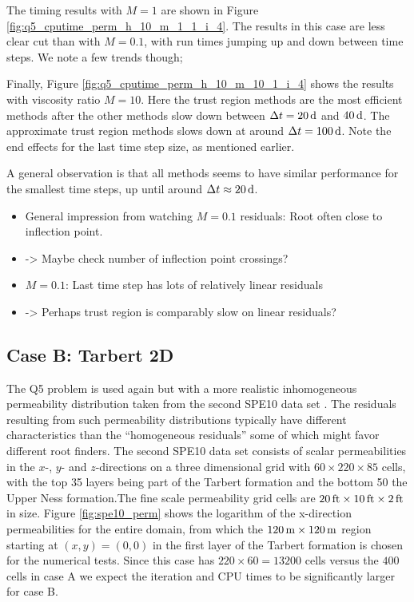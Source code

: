 The timing results with $M = 1$ are shown in Figure \ref{fig:q5_cputime_perm_h_10_m_1_1_i_4}. The results in this case are less clear cut than with $M = 0.1$, with run times jumping up and down between time steps. We note a few trends though; 

Finally, Figure \ref{fig:q5_cputime_perm_h_10_m_10_1_i_4} shows the results with viscosity ratio $M = 10$. Here the trust region methods are the most efficient methods after the other methods slow down between $\Delta t = \unit[20]{d}$ and $\unit[40]{d}$. The approximate trust region methods slows down at around $\Delta t = \unit[100]{d}$. Note the end effects for the last time step size, as mentioned earlier.

A general observation is that all methods seems to have similar performance for the smallest time steps, up until around $\Delta t \approx \unit[20]{d}$.

\begin{itemize}
\item General impression from watching $M=0.1$ residuals: Root often close to inflection point.
\item -> Maybe check number of inflection point crossings?
\item $M=0.1$: Last time step has lots of relatively linear residuals
\item -> Perhaps trust region is comparably slow on linear residuals?
\end{itemize}







\clearpage
\subsection{Case B: Tarbert 2D}
\label{section:caseB}
The Q5 problem is used again but with a more realistic inhomogeneous permeability distribution taken from the second SPE10 data set \citep{spe10_2000}. The residuals resulting from such permeability distributions typically have different characteristics than the ``homogeneous residuals'' some of which might favor different root finders. The second SPE10 data set consists of scalar permeabilities in the $x$-, $y$- and $z$-directions on a three dimensional grid with $60\times 220\times 85$ cells, with the top 35 layers being part of the Tarbert formation and the bottom 50 the Upper Ness formation.The fine scale permeability grid cells are $\unit[20]{ft}\times \unit[10]{ft}\times \unit[2]{ft}$ in size. Figure \ref{fig:spe10_perm} shows the logarithm of the x-direction permeabilities for the entire domain, from which the $\unit[120]{m}\times \unit[120]{m}$ region starting at $(x,y) = (0,0)$ in the first layer of the Tarbert formation is chosen for the numerical tests. Since this case has $220\times 60 = 13200$ cells versus the $400$ cells in case A we expect the iteration and CPU times to be significantly larger for case B.

